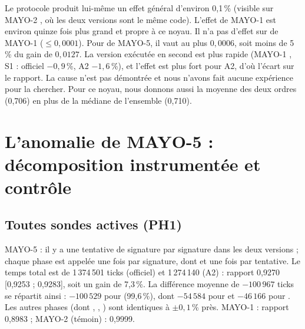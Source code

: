 \F{} Le protocole produit lui-même un effet général d'environ 0,1\,\% (visible sur MAYO-2 , où les deux versions sont le même code). L'effet de MAYO-1  est environ quinze fois plus grand et propre à ce noyau. Il n'a pas d'effet sur  de MAYO-1 ($\le0{,}0001$). Pour  de MAYO-5, il vaut au plus $0{,}0006$, soit moins de 5\,\% du gain de $0{,}0127$. La version exécutée en second est plus rapide (MAYO-1 , S1 : officiel $-0{,}9$\,\%, A2 $-1{,}6$\,\%), et l'effet est plus fort pour A2, d'où l'écart sur le rapport. \Hy{} La cause n'est pas démontrée et nous n'avons fait aucune expérience pour la chercher. Pour ce noyau, nous donnons aussi la moyenne des deux ordres (0,706) en plus de la médiane de l'ensemble (0,710).

\section[Anomalie de MAYO-5]{L'anomalie de MAYO-5 : décomposition instrumentée et contrôle}\label{sec:anomalie}
\subsection{Toutes sondes actives (PH1)}
\F{} MAYO-5 : il y a une tentative de signature par signature dans les deux versions ; chaque phase est appelée une fois par signature, dont  et  une fois par tentative. Le temps total est de 1\,374\,501 ticks (officiel) et 1\,274\,140 (A2) : rapport 0,9270 [0,9253 ; 0,9283], soit un gain de 7,3\,\%. La différence moyenne de $-100\,967$ ticks se répartit ainsi : $-100\,529$ pour  (99,6\,\%), dont $-54\,584$ pour  et $-46\,166$ pour . Les autres phases (dont , , ) sont identiques à $\pm0{,}1$\,\% près. MAYO-1 : rapport 0,8983 ; MAYO-2 (témoin) : 0,9999.

